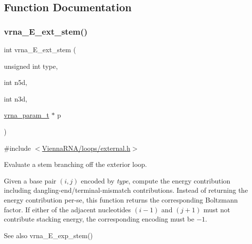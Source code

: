 \subsection{Function Documentation}
\mbox{\label{group__eval__loops__ext_gaa0c313c90da11aa741dcd62746d85337}} 
\subsubsection{\texorpdfstring{vrna\+\_\+\+E\+\_\+ext\+\_\+stem()}{vrna\_E\_ext\_stem()}}
{\footnotesize\ttfamily int vrna\+\_\+\+E\+\_\+ext\+\_\+stem (\begin{DoxyParamCaption}\item[{unsigned int}]{type,  }\item[{int}]{n5d,  }\item[{int}]{n3d,  }\item[{\hyperlink{group__energy__parameters_ga8a69ca7d787e4fd6079914f5343a1f35}{vrna\+\_\+param\+\_\+t} $\ast$}]{p }\end{DoxyParamCaption})}



{\ttfamily \#include $<$\hyperlink{external_8h}{Vienna\+R\+N\+A/loops/external.\+h}$>$}



Evaluate a stem branching off the exterior loop. 

Given a base pair $(i,j)$ encoded by {\itshape type}, compute the energy contribution including dangling-\/end/terminal-\/mismatch contributions. Instead of returning the energy contribution per-\/se, this function returns the corresponding Boltzmann factor. If either of the adjacent nucleotides $(i - 1)$ and $(j+1)$ must not contribute stacking energy, the corresponding encoding must be $-1$.

\begin{DoxySeeAlso}{See also}
vrna\+\_\+\+E\+\_\+exp\+\_\+stem()
\end{DoxySeeAlso}

